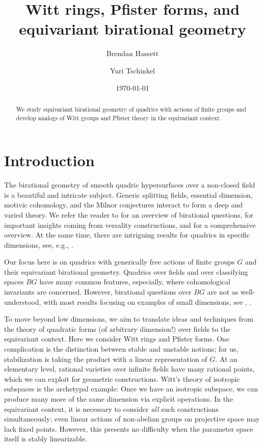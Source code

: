 \documentclass[12pt]{amsart}
\title[Witt rings and Pfister forms]{Witt rings, Pfister forms, and equivariant birational geometry}
\author{Brendan Hassett}
\author{Yuri Tschinkel}
\numberwithin{equation}{section}
\theoremstyle{plain}
\theoremstyle{definition}
\theoremstyle{remark}
\begin{document}
\begin{abstract}
    We study equivariant birational geometry of quadrics with actions of finite groups and develop analogs of Witt groups and Pfister theory in the equivariant context. 
\end{abstract}

\maketitle


\date{\today}













\section{Introduction}

The birational geometry of smooth quadric hypersurfaces over 
a non-closed field is a beautiful and intricate subject. 
Generic splitting fields, essential dimension, motivic cohomology,
and the Milnor conjectures interact to form a deep and varied
theory. We refer the reader to \cite{TotBGQ} for an overview
of birational questions, \cite{DR,KMEDQ} for important insights
coming from versality constructions, and \cite{EKMbook,kahn-book}
for a comprehensive overview. At the same time, there are intriguing results for quadrics in specific dimensions, see, e.g.,  \cite{Hoffmann5D,Karpenko-survey}.

Our focus here is on quadrics with generically free actions of
finite groups $G$ and their equivariant birational geometry. 
Quadrics over fields and over classifying spaces $BG$ have many
common features, especially, where cohomological invariants
are concerned.  However, birational questions over $BG$ are not
as well-understood, with most results focusing on examples 
of small dimensions, see \cite{HTEGLDQ}, \cite[Section 4]{CTZ}. 

To move beyond low dimensions, we aim to translate
ideas and techniques from the theory of quadratic forms 
(of arbitrary dimension!) over fields to the equivariant context.
Here we consider Witt rings and Pfister forms. One complication is
the distinction between stable and unstable notions;
for us, stabilization is taking the product with a linear representation
of $G$. At an elementary level, rational varieties over infinite
fields have many rational points, which we can exploit for geometric
constructions. Witt's theory of isotropic subspaces is the
archetypal example: Once we have an isotropic subspace, we can produce
many more of the same dimension via explicit operations.
In the equivariant context, it is necessary to consider {\em all} such
constructions simultaneously; even linear actions of non-abelian
groups on projective space may lack fixed points.  However, this
presents no difficulty when the parameter space itself
is stably linearizable.
\end{document}
